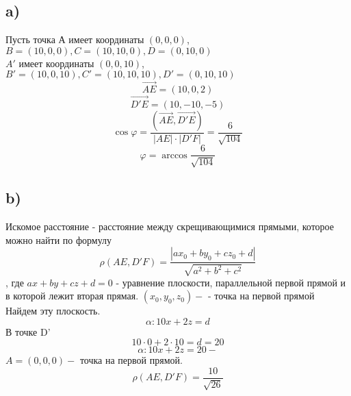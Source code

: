 	\subsection*{a)}
	Пусть точка А имеет координаты $(0, 0, 0)$, $B = (10, 0, 0), C = (10,10, 0), D= (0, 10, 0)$ \\
	$A'$ имеет координаты $(0, 0, 10)$, $B' = (10, 0, 10), C' = (10,10, 10), D'= (0, 10, 10)$\\
	$$\overrightarrow{AE} = (10, 0, 2)$$
	$$\overrightarrow{D'E} = (10, -10, -5)$$
	$$\cos\varphi =\frac{ (\overrightarrow{AE},\overrightarrow{D'E} )}{|AE|\cdot |D'F|} = \frac{6}{\sqrt{104}}$$
	$$\varphi = \arccos\frac{6}{\sqrt{104}} $$
	\subsection*{b)}
	Искомое расстояние - расстояние между скрещивающимися прямыми, которое можно найти по формулу
	$$\rho(AE, D'F) = \frac{|ax_0+by_0+cz_0+d|}{\sqrt{a^2+b^2+c^2}}$$,
	где $ax+by+cz+d=0$ - уравнение плоскости, параллельной первой прямой и в которой лежит вторая прямая. $(x_0, y_0, z_0) - \text{ - точка на первой прямой}$\\
	Найдем эту плоскость.
	$$\alpha \colon10x+2z = d$$
	В точке D'
	$$10\cdot0 + 2\cdot10=d = 20$$
		$$\alpha \colon10x+2z = 20 - $$
	$A = (0, 0,0) - $ точка на первой прямой.
	 $$\rho(AE, D'F) =\frac{10}{\sqrt{26}}$$
